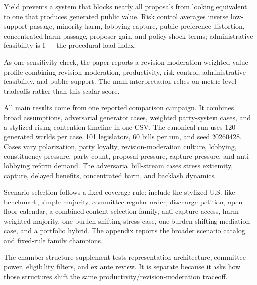 \documentclass[manuscript]{acmart}
\begin{document}
Yield prevents a system that blocks nearly all proposals from looking equivalent to one that produces generated public value. Risk control averages inverse low-support passage, minority harm, lobbying capture, public-preference distortion, concentrated-harm passage, proposer gain, and policy shock terms; administrative feasibility is \(1-\) the procedural-load index.

As one sensitivity check, the paper reports a revision-moderation-weighted value profile combining revision moderation, productivity, risk control, administrative feasibility, and public support. The main interpretation relies on metric-level tradeoffs rather than this scalar score.

All main results come from one reported comparison campaign. It combines broad assumptions, adversarial generator cases, weighted party-system cases, and a stylized rising-contention timeline in one CSV. The canonical run uses 120 generated worlds per case, 101 legislators, 60 bills per run, and seed 20260428. Cases vary polarization, party loyalty, revision-moderation culture, lobbying, constituency pressure, party count, proposal pressure, capture pressure, and anti-lobbying reform demand. The adversarial bill-stream cases stress extremity, capture, delayed benefits, concentrated harm, and backlash dynamics.

Scenario selection follows a fixed coverage rule: include the stylized U.S.-like benchmark, simple majority, committee regular order, discharge petition, open floor calendar, a combined content-selection family, anti-capture access, harm-weighted majority, one burden-shifting stress case, one burden-shifting mediation case, and a portfolio hybrid. The appendix reports the broader scenario catalog and fixed-rule family champions.



The chamber-structure supplement tests representation architecture, committee power, eligibility filters, and ex ante review. It is separate because it asks how those structures shift the same productivity/revision-moderation tradeoff.
\end{document}
